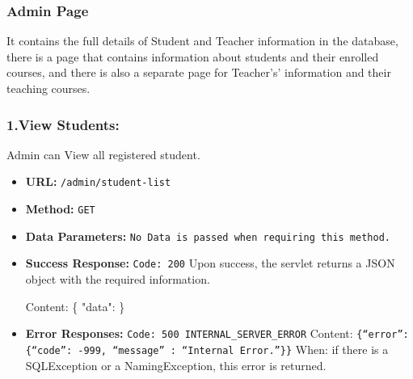 \subsubsection*{Admin Page}
It contains the full details of Student and Teacher information in the database, there is a page that contains information about students and their enrolled courses, and there is also a separate page for Teacher's' information and their teaching courses.

\subsubsection* {1.View Students:}
Admin can View all registered student.
\begin{itemize}
    \item \textbf {URL:} \texttt{/admin/student-list}
    \item \textbf {Method:} \texttt{GET}
    \item \textbf {Data Parameters:} \texttt{No Data is passed when requiring this method.}
    \item \textbf {Success Response:} \texttt{Code: 200} \newline
    Upon success, the servlet returns a JSON object with the required information.\newline

    Content: \newline
    \{ \newline
    "data":  \newline
    \}
    \item \textbf {Error Responses:} \texttt{Code: 500 INTERNAL\_SERVER\_ERROR} \newline
    Content: \texttt {\{“error”: \{“code”: -999, “message” : “Internal Error.”\}\}} \newline
    When: if there is a SQLException or a NamingException, this error is returned.
\end{itemize}


